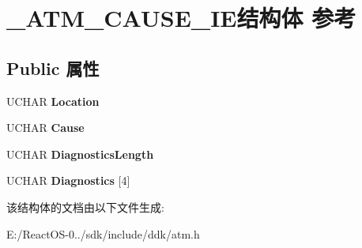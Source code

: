 \hypertarget{struct___a_t_m___c_a_u_s_e___i_e}{}\section{\+\_\+\+A\+T\+M\+\_\+\+C\+A\+U\+S\+E\+\_\+\+I\+E结构体 参考}
\label{struct___a_t_m___c_a_u_s_e___i_e}
\subsection*{Public 属性}
\begin{DoxyCompactItemize}
\item 
\mbox{\label{struct___a_t_m___c_a_u_s_e___i_e_a24bf2345cef3d73d5be1d5373f889cde}} 
U\+C\+H\+AR {\bfseries Location}
\item 
\mbox{\label{struct___a_t_m___c_a_u_s_e___i_e_a6c6da005b4fbd75033bcf3a659ddb7c4}} 
U\+C\+H\+AR {\bfseries Cause}
\item 
\mbox{\label{struct___a_t_m___c_a_u_s_e___i_e_aeb6192695a3ae81eac04e1d43ab83e11}} 
U\+C\+H\+AR {\bfseries Diagnostics\+Length}
\item 
\mbox{\label{struct___a_t_m___c_a_u_s_e___i_e_a60b7d30e764187573c19590956e932f1}} 
U\+C\+H\+AR {\bfseries Diagnostics} \mbox{[}4\mbox{]}
\end{DoxyCompactItemize}


该结构体的文档由以下文件生成\+:\begin{DoxyCompactItemize}
\item 
E\+:/\+React\+O\+S-\/0../sdk/include/ddk/atm.\+h\end{DoxyCompactItemize}
